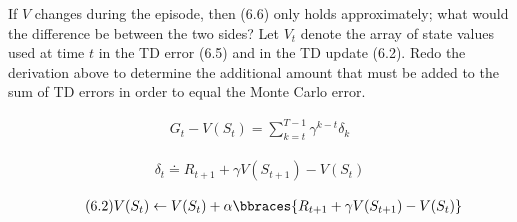 
\begin{exercise}

If $V$ changes during the episode, then (6.6) only holds approximately; what would the difference be between the two sides? Let $V_t$ denote the array of state values used at time $t$ in the TD error (6.5) and in the TD update (6.2). Redo the derivation above to determine the additional amount that must be added to the sum of TD errors in order to equal the Monte Carlo error.

\begin{align} \label{eq:6.6} \tag{6.6}
    G_t - V(S_t)
    =
    \sum_{k=t}^{T-1}
        \gamma^{k-t}
        \delta_k
\end{align}

\begin{align} \label{eq:6.5} \tag{6.5}
    \delta_t
    \doteq
    R_{t+1} + \gamma V(S_{t+1}) - V(S_t)
\end{align}

\begin{align} \label{eq:6.2} \tag{6.2}
    V(S_t)
    \leftarrow
    V(S_t) + \alpha \bbraces{R_{t+1} + \gamma V(S_{t+1}) - V(S_t)}
\end{align}
\end{exercise}


